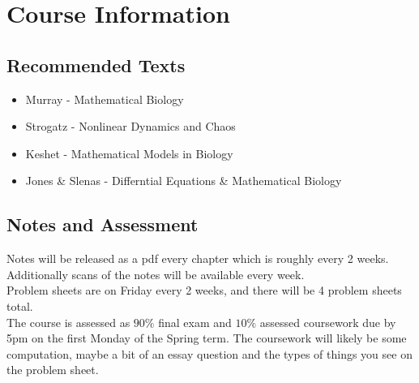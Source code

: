 \section{Course Information}
\subsection{Recommended Texts}
\begin{itemize}
  \item Murray - Mathematical Biology
  \item Strogatz - Nonlinear Dynamics and Chaos
  \item Keshet - Mathematical Models in Biology
  \item Jones \& Slenas - Differntial Equations \& Mathematical Biology
\end{itemize}
\subsection{Notes and Assessment}
Notes will be released as a pdf every chapter which is roughly every 2 weeks. Additionally scans of the notes will be available every week.\\
Problem sheets are on Friday every 2 weeks, and there will be 4 problem sheets total.\\
The course is assessed as $90\%$ final exam and $10\%$ assessed coursework due by 5pm on the first Monday of the Spring term. The coursework will likely be some computation, maybe a bit of an essay question and the types of things you see on the problem sheet.
